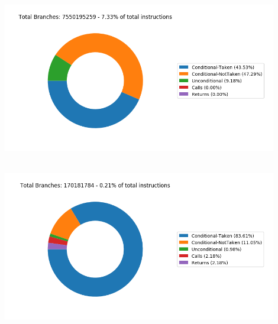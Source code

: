    \begin{minipage}{\textwidth}
      \begin{center}
         \\
         \vspace{3mm}
         \includegraphics[width=0.9\textwidth, frame]{./graphs/4-1/434-zeusmp.png}
         \vspace{6mm}
      \end{center}
   \end{minipage}

   \begin{minipage}{\textwidth}
      \begin{center}
         \\
         \vspace{3mm}
         \includegraphics[width=0.9\textwidth, frame]{./graphs/4-1/436-cactusADM.png}
         \vspace{6mm}
      \end{center}
   \end{minipage}

